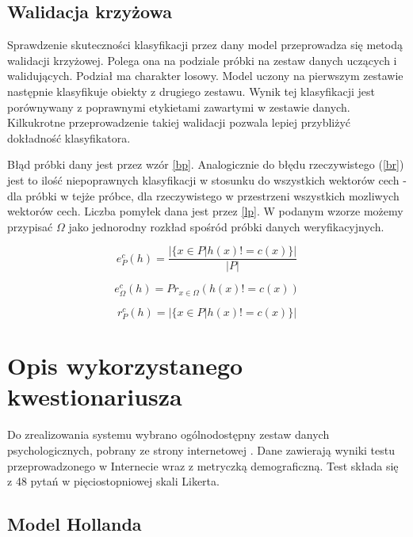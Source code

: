 \documentclass[12pt,a4paper,oneside]{report} %
\begin{document}
\section{Walidacja krzyżowa}

Sprawdzenie skuteczności klasyfikacji przez dany model przeprowadza się metodą walidacji krzyżowej. Polega ona na podziale próbki na zestaw danych uczących i walidujących. Podział ma charakter losowy. Model uczony na pierwszym zestawie następnie klasyfikuje obiekty z drugiego zestawu. Wynik tej klasyfikacji jest porównywany z poprawnymi etykietami zawartymi w zestawie danych. Kilkukrotne przeprowadzenie takiej walidacji pozwala lepiej przybliżyć dokładność klasyfikatora.\par

Błąd próbki dany jest przez wzór \ref{bp}. Analogicznie do błędu rzeczywistego (\ref{br}) jest to ilość niepoprawnych klasyfikacji w stosunku do wszystkich wektorów cech - dla próbki w tejże próbce, dla rzeczywistego w przestrzeni wszystkich mozliwych wektorów cech. Liczba pomyłek dana jest przez \ref{lp}. W podanym wzorze możemy przypisać $\Omega$ jako jednorodny rozkład spośród próbki danych weryfikacyjnych.


\begin{equation}
e_P^c(h) = \frac{| \{ x \in P | h(x) != c(x) \} |}{|P|}
\end{equation}
\label{bp}

\begin{equation}
e_\Omega^c (h) = Pr_{x \in \Omega}(h(x) != c(x))
\end{equation}
\label{br}

\begin{equation}
r_P^c(h) = | \{ x \in P | h(x) != c(x) \} | 
\end{equation}
\label{lp}

\chapter{Opis wykorzystanego kwestionariusza}

Do zrealizowania systemu wybrano ogólnodostępny zestaw danych psychologicznych, pobrany ze strony internetowej \cite{raw_data}. Dane zawierają wyniki testu przeprowadzonego w Internecie wraz z metryczką demograficzną. Test składa się z 48 pytań w pięciostopniowej skali Likerta.\par

\section{Model Hollanda}
\end{document}
